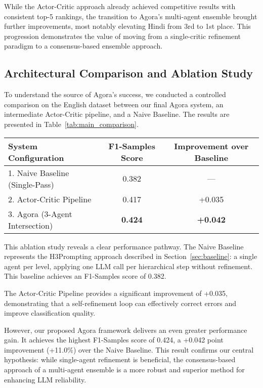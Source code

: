 While the Actor-Critic approach already achieved competitive results with consistent top-5 rankings, the transition to Agora's multi-agent ensemble brought further improvements, most notably elevating Hindi from 3rd to 1st place. This progression demonstrates the value of moving from a single-critic refinement paradigm to a consensus-based ensemble approach.

\subsection{Architectural Comparison and Ablation Study}

To understand the source of Agora's success, we conducted a controlled comparison on the English dataset between our final Agora system, an intermediate Actor-Critic pipeline, and a Naive Baseline. The results are presented in Table~\ref{tab:main_comparison}.

\begin{table*}[ht]
\centering
\caption{Main Performance Comparison on the English Dataset (F1-Samples).}
\label{tab:main_comparison}
\begin{tabular}{lcc}
\hline
\textbf{System Configuration} & \textbf{F1-Samples Score} & \textbf{Improvement over Baseline} \\
\hline
1. Naive Baseline (Single-Pass) & 0.382 & --- \\
2. Actor-Critic Pipeline & 0.417 & +0.035 \\
3. Agora (3-Agent Intersection) & \textbf{0.424} & \textbf{+0.042} \\
\hline
\end{tabular}
\end{table*}

This ablation study reveals a clear performance pathway. The Naive Baseline represents the H3Prompting approach described in Section~\ref{sec:baseline}: a single agent per level, applying one LLM call per hierarchical step without refinement. This baseline achieves an F1-Samples score of 0.382.

The Actor-Critic Pipeline provides a significant improvement of +0.035, demonstrating that a self-refinement loop can effectively correct errors and improve classification quality.

However, our proposed Agora framework delivers an even greater performance gain. It achieves the highest F1-Samples score of 0.424, a +0.042 point improvement (+11.0\%) over the Naive Baseline. This result confirms our central hypothesis: while single-agent refinement is beneficial, the consensus-based approach of a multi-agent ensemble is a more robust and superior method for enhancing LLM reliability.

